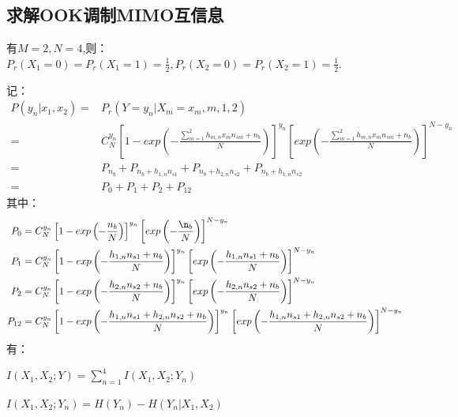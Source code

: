 \documentclass[12pt]{article}
\begin{document}
\subsection{求解OOK调制MIMO互信息}
有$M=2,N=4$,则：$P_r(X_1=0)=P_r(X_1=1)=\frac{1}{2},P_r(X_2=0)=P_r(X_2=1)=\frac{1}{2}$.
\par
记：
\begin{equation*}
    \begin{aligned}
       P(y_n|x_1,x_2)=&P_r(Y=y_n|X_m=x_m,m,1,2) \\
       =&C_N^{y_n}\left[1-exp\left(-\frac{\sum_{m=1}^2h_{m,n}x_{m}n_{sm}+n_b}{N}\right)\right]^{y_n}\left[exp\left(-\frac{\sum_{m=1}^2h_{m,n}x_{m}n_{sm}+n_b}{N}\right)\right]^{N-y_n} \\
       =&P_{n_b}+P_{n_b+h_{1,n}n_{s1}}+P_{n_b+h_{2,n}n_{s2}}+P_{n_b+h_{1,n}n_{s2}}\\
       =&P_0+P_1+P_2+P_{12}
    \end{aligned}
\end{equation*}
其中：
\begin{equation*}
    \begin{aligned}
       P_0&=C_N^{y_n}\left[1-exp\left(-\frac{n_b}{N}\right)\right]^{y_n}\left[exp\left(-\frac{\n_b}{N}\right)\right]^{N-y_n} \\
       P_1&=C_N^{y_n}\left[1-exp\left(-\frac{h_{1,n}n_{s1}+n_b}{N}\right)\right]^{y_n}\left[exp\left(-\frac{h_{1,n}n_{s1}+n_b}{N}\right)\right]^{N-y_n} \\
       P_2&=C_N^{y_n}\left[1-exp\left(-\frac{h_{2,n}n_{s2}+n_b}{N}\right)\right]^{y_n}\left[exp\left(-\frac{h_{2,n}n_{s2}+n_b}{N}\right)\right]^{N-y_n} \\
       P_{12}&=C_N^{y_n}\left[1-exp\left(-\frac{h_{1,n}n_{s1}+h_{2,n}n_{s2}+n_b}{N}\right)\right]^{y_n}\left[exp\left(-\frac{h_{1,n}n_{s1}+h_{2,n}n_{s2}+n_b}{N}\right)\right]^{N-y_n}
    \end{aligned}
\end{equation*}
有：\par
$I(X_1,X_2;Y)=\sum_{n=1}^4I(X_1,X_2;Y_n)$\par
$I(X_1,X_2;Y_n)=H(Y_n)-H(Y_n|X_1,X_2)$
\end{document}
